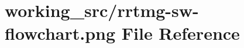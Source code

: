 \hypertarget{rrtmg-sw-flowchart_8png}{}\section{working\+\_\+src/rrtmg-\/sw-\/flowchart.png File Reference}
\label{rrtmg-sw-flowchart_8png}
